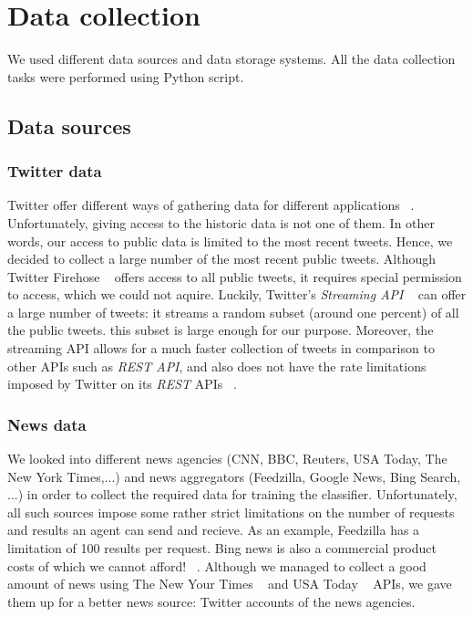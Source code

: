 \documentclass{llncs}
\begin{document}
\section{Data collection}
We used different data sources and data storage systems. All the data collection tasks were performed using Python script.
\subsection{Data sources}
\subsubsection{Twitter data}
Twitter offer different ways of gathering data for different applications ~\cite{twitterdocumentation}. Unfortunately, giving access to the historic data is not one of them. In other words, our access to public data is limited to the most recent tweets. Hence, we decided to collect a large number of the most recent public tweets. 
Although Twitter Firehose ~\cite{twitterrestapi} offers access to all public tweets, it requires special permission to access, which we could not aquire. Luckily, Twitter's \textit{Streaming API} ~\cite{twitterstreaming} can offer a large number of tweets: it streams a random subset (around one percent) of all the public tweets. this subset is large enough for our purpose. Moreover, the streaming API allows for a much faster collection of tweets in comparison to other APIs such as \textit{REST API}, and also does not have the rate limitations imposed by Twitter on its \textit{REST} APIs ~\cite{twitterdocumentation}. 


\subsubsection{News data}
We looked into different news agencies (CNN, BBC, Reuters, USA Today, The New York Times,...) and news aggregators (Feedzilla, Google News, Bing Search, ...) in order to collect the required data for training the classifier. Unfortunately, all such sources impose some rather strict limitations on the number of requests and results an agent can send and recieve. As an example, Feedzilla has a limitation of 100 results per request. Bing news is also a commercial product costs of which we cannot afford! ~\cite{bingsearchapi}. Although we managed to collect a good amount of news using The New Your Times ~\cite{thenytimes} and USA Today ~\cite{thenytimes} APIs, we gave them up for a better news source: Twitter accounts of the news agencies. 
\end{document}
